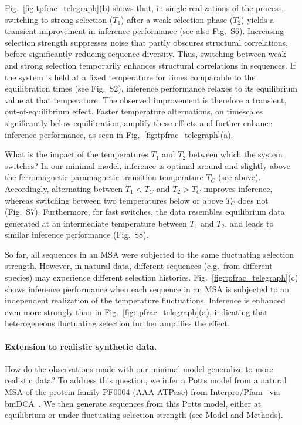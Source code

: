 \documentclass[
 reprint,








nobibnotes,

 amsmath,amssymb,
 aps,
 prl,
 longbibliography






]{revtex4-2}
\begin{document}
Fig.~\ref{fig:tpfrac_telegraph}(b) shows that, in single realizations of the process, switching to strong selection ($T_1$) after a weak selection phase ($T_2$) yields a transient improvement in inference performance (see also Fig.~S6). Increasing selection strength suppresses noise that partly obscures structural correlations, before significantly reducing sequence diversity. Thus, switching between weak and strong selection temporarily enhances structural correlations in sequences. If the system is held at a fixed temperature for times comparable to the equilibration times (see Fig.~S2), inference performance relaxes to its equilibrium value at that temperature. The observed improvement is therefore a transient, out-of-equilibrium effect. Faster temperature alternations, on timescales significantly below equilibration, amplify these effects and further enhance inference performance, as seen in Fig.~\ref{fig:tpfrac_telegraph}(a).

What is the impact of the temperatures $T_1$ and $T_2$ between which the system switches? In our minimal model, inference is optimal around and slightly above the ferromagnetic-paramagnetic transition temperature $T_C$ (see above). Accordingly, alternating between $T_1<T_C$ and $T_2>T_C$ improves inference, whereas switching between two temperatures below or above $T_C$ does not (Fig.~S7). Furthermore, for fast switches, the data resembles equilibrium data generated at an intermediate temperature between $T_1$ and $T_2$, and leads to similar inference performance (Fig.~S8).

So far, all sequences in an MSA were subjected to the same fluctuating selection strength. However, in natural data, different sequences (e.g.\ from different species) may experience different selection histories. Fig.~\ref{fig:tpfrac_telegraph}(c) shows inference performance when each sequence in an MSA is subjected to an independent realization of the temperature fluctuations. Inference is enhanced even more strongly than in Fig.~\ref{fig:tpfrac_telegraph}(a), indicating that heterogeneous fluctuating selection further amplifies the effect.


\paragraph*{Extension to realistic synthetic data.}
How do the observations made with our minimal model generalize to more realistic data? To address this question, we infer a Potts model from a natural MSA of the protein family PF0004 (AAA ATPase) from Interpro/Pfam~\cite{mistry2021pfam} via bmDCA~\cite{Figliuzzi18,Russ20}. We then generate sequences from this Potts model, either at equilibrium or under fluctuating selection strength (see Model and Methods).
\end{document}
